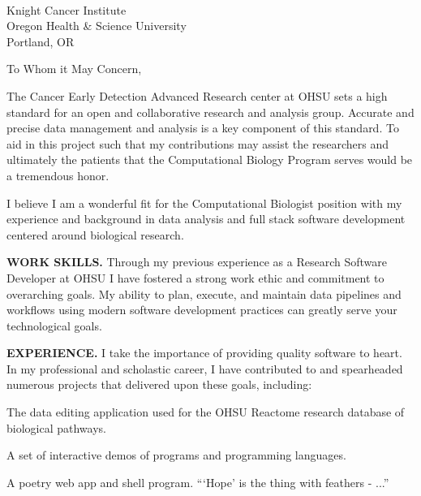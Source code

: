 



\textcolor{my-grey}{\dotfill}
\bigbreak

{\DTMtoday}\\
Knight Cancer Institute\\
Oregon Health \& Science University\\
Portland, OR

\vspace*{2\baselineskip}

To Whom it May Concern,

\vspace*{\baselineskip}

The Cancer Early Detection Advanced Research center at OHSU sets a high standard for an open and collaborative research and analysis group. Accurate and precise data management and analysis is a key component of this standard. To aid in this project such that my contributions may assist the researchers and ultimately the patients that the Computational Biology Program serves would be a tremendous honor.

\vspace*{\baselineskip}

I believe I am a wonderful fit for the Computational Biologist position with my experience and background in data analysis and full stack software development centered around biological research.

\vspace*{\baselineskip}

\textbf{WORK SKILLS.} Through my previous experience as a Research Software Developer at OHSU I have fostered a strong work ethic and commitment to overarching goals. My ability to plan, execute, and maintain data pipelines and workflows using modern software development practices can greatly serve your technological goals.

\vspace*{\baselineskip}

\textbf{EXPERIENCE.} I take the importance of providing quality software to heart. In my professional and scholastic career, I have contributed to and spearheaded numerous projects that delivered upon these goals, including:

\begin{itemize}[label=$\triangleright$]
The data editing application used for the OHSU Reactome research database of biological pathways.

A set of interactive demos of programs and programming languages.

A poetry web app and shell program. ```Hope' is the thing with feathers - ...''

\end{itemize}

